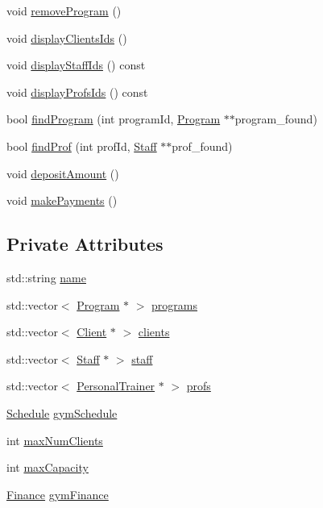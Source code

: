 \begin{DoxyCompactItemize}
\item 
void \hyperlink{classGym_a01fba21147b2643b4423b935554eb411}{remove\+Program} ()
\item 
void \hyperlink{classGym_a39614ab4b405f66371cbdafb548b5cb9}{display\+Clients\+Ids} ()
\item 
void \hyperlink{classGym_ae966562c6dbed9558dc40d3f141026a9}{display\+Staff\+Ids} () const 
\item 
void \hyperlink{classGym_a97160287a92ea777c21df872cf5f8ea3}{display\+Profs\+Ids} () const 
\item 
bool \hyperlink{classGym_af21c245de67f3d30203352e2b4aa1dc4}{find\+Program} (int program\+Id, \hyperlink{classProgram}{Program} $\ast$$\ast$program\+\_\+found)
\item 
bool \hyperlink{classGym_a6a160af6f8732070dd0123bb9447409b}{find\+Prof} (int prof\+Id, \hyperlink{classStaff}{Staff} $\ast$$\ast$prof\+\_\+found)
\item 
void \hyperlink{classGym_ace102a44881da97b6e4bc287126875a2}{deposit\+Amount} ()
\item 
void \hyperlink{classGym_a96ee6c0fa0e156bc32baa54bf8fb9772}{make\+Payments} ()
\end{DoxyCompactItemize}
\subsection*{Private Attributes}
\begin{DoxyCompactItemize}
\item 
std\+::string \hyperlink{classGym_a56d26a68f26527592d516348383aed25}{name}
\item 
std\+::vector$<$ \hyperlink{classProgram}{Program} $\ast$ $>$ \hyperlink{classGym_aeeff90e89fb7b1710886cbf85fc477de}{programs}
\item 
std\+::vector$<$ \hyperlink{classClient}{Client} $\ast$ $>$ \hyperlink{classGym_a30a9153e0d241801fdc55c3ef3008767}{clients}
\item 
std\+::vector$<$ \hyperlink{classStaff}{Staff} $\ast$ $>$ \hyperlink{classGym_a9108e2c97ee58a50e491461559aa12fe}{staff}
\item 
std\+::vector$<$ \hyperlink{classPersonalTrainer}{Personal\+Trainer} $\ast$ $>$ \hyperlink{classGym_afc05320302a5dac7d3b2cb4dfbe42371}{profs}
\item 
\hyperlink{classSchedule}{Schedule} \hyperlink{classGym_ad48bb78d56dcd88bb4f9f283084a9f37}{gym\+Schedule}
\item 
int \hyperlink{classGym_ae0ba7b88dfa18bf69a600dc6bbc437c0}{max\+Num\+Clients}
\item 
int \hyperlink{classGym_aa44c525d930ea2ef376d486927caf027}{max\+Capacity}
\item 
\hyperlink{classFinance}{Finance} \hyperlink{classGym_a3cb79db88f1d6463006e3db741b3992f}{gym\+Finance}
\end{DoxyCompactItemize}
